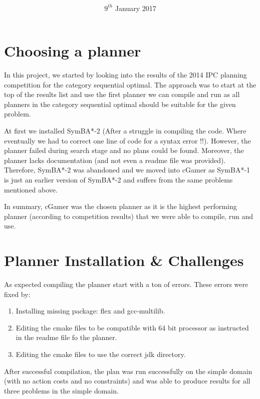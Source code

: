 \documentclass{article}
\title{
\vspace{2in}
\textmd{\textbf{\hmwkClass\ \\ \hmwkTitle}}\\
\vspace{0.1in}\large{\textit{\hmwkClassInstructor\ }}
\vspace{3in}
}
\author{\textbf{\hmwkAuthorName}}
\date{$9^{th}$ January 2017} %
\begin{document}
\maketitle
\newpage

\section{Choosing a planner}

In this project, we started by looking into the results of the 2014 IPC planning competition \cite{ipc}  for the category sequential optimal. The approach was to start at the top of the results list and use the first planner we can compile and run as all planners in the category sequential optimal should be suitable for the given problem.

At first we installed SymBA*-2 \cite{symba2} (After a struggle in compiling the code. Where eventually we had to correct one line of code for a syntax error !!). However, the planner failed during search stage and no plans could be found. Moreover, the planner lacks documentation (and not even a readme file was provided). Therefore, SymBA*-2 was abandoned and we moved into cGamer \cite{cGamer} as SymBA*-1 \cite{symba2} is just an earlier version of SymBA*-2 and suffers from the same problems mentioned above.

In summary, cGamer was the chosen planner as it is the highest performing planner (according to competition results) that we were able to compile, run and use.

\section{Planner Installation \& Challenges}

As expected compiling the planner start with a ton of errors. These errors were fixed by:
\begin{enumerate}
	\item Installing missing package: flex and gcc-multilib.
	\item Editing the cmake files to be compatible with 64 bit processor as instructed in the readme file fo the planner.
	\item Editing the cmake files to use the correct jdk directory.
\end{enumerate}

After successful compilation, the plan was run successfully on the simple domain (with no action costs and no constraints) and was able to produce results for all three problems in the simple domain.
\end{document}

